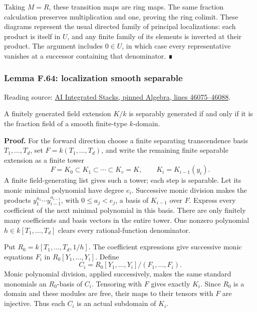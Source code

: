 \documentclass[11pt,a4paper,openany]{report}
\begin{document}
Taking \(M=R\), these transition maps are ring maps. The same fraction calculation preserves multiplication and one, proving the ring colimit. These diagrams represent the usual directed family of principal localizations: each product is itself in \(U\), and any finite family of its elements is inverted at their product. The argument includes \(0\in U\), in which case every representative vanishes at a successor containing that denominator. ∎

\label{AG-RG-S05-algebra-lemma-localization-smooth-separable}

\subsubsection{Lemma F.64: localization smooth separable}\label{AG-RG-S05-lemma-f.64-localization-smooth-separable}

Reading source: \href{https://github.com/KokunoYumeto/unofficial-stacks-project-ai-drafts/blob/565b10e987aba5969b21145a0833f42d69f96790/algebra.tex\#L46075-L46088}{AI Integrated Stacks, pinned Algebra, lines 46075--46088}.

A finitely generated field extension \(K/k\) is separably generated if and only if it is the fraction field of a smooth finite-type \(k\)-domain.

\textbf{Proof.} For the forward direction choose a finite separating transcendence basis \(T_1,\ldots,T_d\), set \(F=k(T_1,\ldots,T_d)\), and write the remaining finite separable extension as a finite tower \[F=K_0\subset K_1\subset\cdots\subset K_r=K,\qquad K_i=K_{i-1}(y_i).\] A finite field-generating list gives such a tower; each step is separable. Let its monic minimal polynomial have degree \(e_i\). Successive monic division makes the products \(y_1^{a_1}\cdots y_{i-1}^{a_{i-1}}\), with \(0\leq a_j<e_j\), a basis of \(K_{i-1}\) over \(F\). Express every coefficient of the next minimal polynomial in this basis. There are only finitely many coefficients and basis vectors in the entire tower. One nonzero polynomial \(h\in k[T_1,\ldots,T_d]\) clears every rational-function denominator.

Put \(R_0=k[T_1,\ldots,T_d,1/h]\). The coefficient expressions give successive monic equations \(F_i\) in \(R_0[Y_1,\ldots,Y_i]\). Define \[C_i=R_0[Y_1,\ldots,Y_i]/(F_1,\ldots,F_i).\] Monic polynomial division, applied successively, makes the same standard monomials an \(R_0\)-basis of \(C_i\). Tensoring with \(F\) gives exactly \(K_i\). Since \(R_0\) is a domain and these modules are free, their maps to their tensors with \(F\) are injective. Thus each \(C_i\) is an actual subdomain of \(K_i\).
\end{document}
